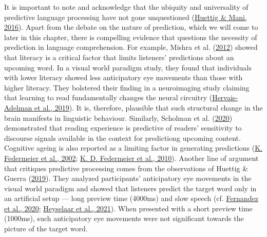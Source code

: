 \documentclass[a4paper, nobind]{templates/ociamthesis}
\begin{document}
It is important to note and acknowledge that the ubiquity and universality of predictive language processing have not gone unquestioned (\protect\hyperlink{ref-Huettig2016}{Huettig \& Mani, 2016}).
Apart from the debate on the nature of prediction, which we will come to later in this chapter, there is compelling evidence that questions the necessity of prediction in language comprehension.
For example, Mishra et al. (\protect\hyperlink{ref-Mishra2012}{2012}) showed that literacy is a critical factor that limits listeners' predictions about an upcoming word.
In a visual world paradigm study, they found that individuals with lower literacy showed less anticipatory eye movements than those with higher literacy.
They bolstered their finding in a neuroimaging study claiming that learning to read fundamentally changes the neural circuitry (\protect\hyperlink{ref-Hervais2019}{Hervais-Adelman et al., 2019}).
It is, therefore, plausible that such structural change in the brain manifests in linguistic behaviour.
Similarly, Scholman et al. (\protect\hyperlink{ref-Scholman2020}{2020}) demonstrated that reading experience is predictive of readers' sensitivity to discourse signals available in the context for predictiong upcoming content.
Cognitive ageing is also reported as a limiting factor in generating predictions (\protect\hyperlink{ref-Federmeier2002}{K. Federmeier et al., 2002}; \protect\hyperlink{ref-Federmeier2010}{K. D. Federmeier et al., 2010}).
Another line of argument that critiques predictive processing comes from the observations of Huettig \& Guerra (\protect\hyperlink{ref-Huettig2019}{2019}).
They analyzed participants' anticipatory eye movements in the visual world paradigm and showed that listeners predict the target word only in an artificial setup --- long preview time (4000ms) and slow speech (cf. \protect\hyperlink{ref-Fernandez2020}{Fernandez et al., 2020}; \protect\hyperlink{ref-Heyselaar2021}{Heyselaar et al., 2021}).
When presented with a short preview time (1000ms), such anticipatory eye movements were not significant towards the picture of the target word.
\end{document}
